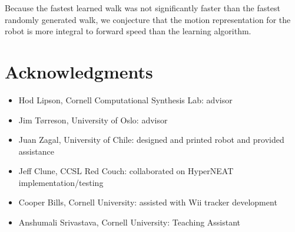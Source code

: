 
Because the fastest learned walk was not
significantly faster than the fastest randomly generated walk, we
conjecture that the motion representation for the robot is more
integral to forward speed than the learning algorithm.



\section{Acknowledgments}
\begin{itemize}
\item Hod Lipson, Cornell Computational Synthesis Lab: advisor
\item Jim T\o rreson, University of Oslo: advisor
\item Juan Zagal, University of Chile: designed and printed robot and provided assistance
\item Jeff Clune, CCSL Red Couch: collaborated on HyperNEAT implementation/testing
\item Cooper Bills, Cornell University: assisted with Wii tracker development
\item Anshumali Srivastava, Cornell University: Teaching Assistant
\end{itemize}

